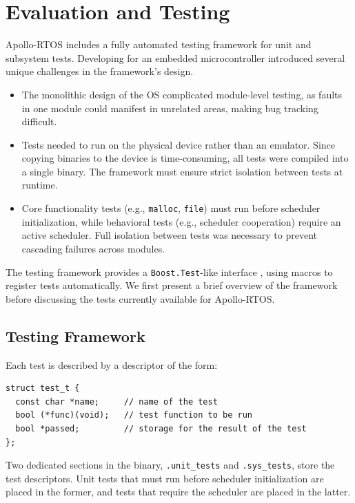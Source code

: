 \section{Evaluation and Testing}
\label{sec:testing}

Apollo-RTOS includes a fully automated testing framework for unit and subsystem tests.
Developing for an embedded microcontroller introduced several unique challenges in the
framework's design.

\begin{itemize}
    \item The monolithic design of the OS complicated module-level testing, as faults
        in one module could manifest in unrelated areas, making bug tracking difficult.

    \item Tests needed to run on the physical device rather than an emulator. Since
        copying binaries to the device is time-consuming, all tests were compiled into
        a single binary. The framework must ensure strict isolation between tests at
        runtime.

    \item Core functionality tests (e.g., \lstinline[style=myagc]|malloc|,
        \lstinline[style=myagc]|file|) must run before scheduler initialization, while
        behavioral tests (e.g., scheduler cooperation) require an active scheduler.
        Full isolation between tests was necessary to prevent cascading failures across
        modules.
\end{itemize}

The testing framework provides a \texttt{Boost.Test}-like interface \citep{boost_test},
using macros to register tests automatically. We first present a brief overview of the
framework before discussing the tests currently available for Apollo-RTOS.


\subsection{Testing Framework}

Each test is described by a descriptor of the form:
\begin{lstlisting}[style=myagc]
struct test_t {
  const char *name;     // name of the test
  bool (*func)(void);   // test function to be run
  bool *passed;         // storage for the result of the test
};
\end{lstlisting}

Two dedicated sections in the binary, \lstinline[style=myagc]|.unit_tests| and
\lstinline[style=myagc]|.sys_tests|, store the test descriptors. Unit tests that must
run before scheduler initialization are placed in the former, and tests that require
the scheduler are placed in the latter.

